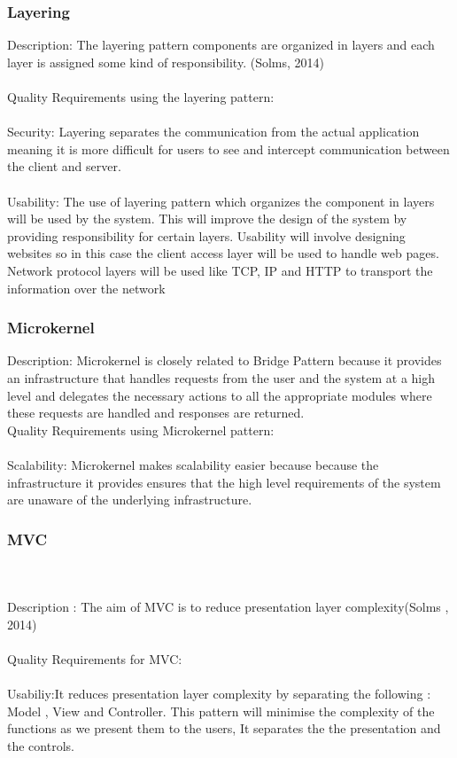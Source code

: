  \subsubsection{Layering}
 Description: The layering pattern components are organized in layers and each layer is assigned some kind of responsibility. (Solms, 2014)\\
 \\

 Quality Requirements using the layering pattern:\\
 \\
 Security: Layering separates the communication from the actual application meaning it is more difficult for users to see and intercept communication between the client and server.\\
  \\Usability: The use of layering pattern which organizes the component in layers will be used by the system. This will improve the design of the system by providing responsibility for certain layers. Usability will involve designing websites so in this case the client access layer will be used to handle web pages. Network protocol layers will be used like TCP, IP and HTTP to transport the information over the network\\
 
\subsubsection{Microkernel}
Description: Microkernel is closely related to Bridge Pattern because it provides an infrastructure that handles requests from the user and the system at a high level and delegates the necessary actions to all the appropriate modules where these requests are handled and responses are returned.
\\
Quality Requirements using Microkernel pattern:\\
\\
Scalability: Microkernel makes scalability easier because because the infrastructure it provides ensures that the high level requirements of the system are unaware of the underlying infrastructure.\\

\subsubsection{MVC}\\
\\ Description : The aim of MVC is to reduce presentation layer complexity(Solms , 2014)\\

\\Quality Requirements for MVC:\\

\\Usabiliy:It reduces presentation layer complexity by separating the following : Model , View and Controller. This pattern will minimise the complexity of the functions as we present them to the users, It separates the the presentation and the controls.


